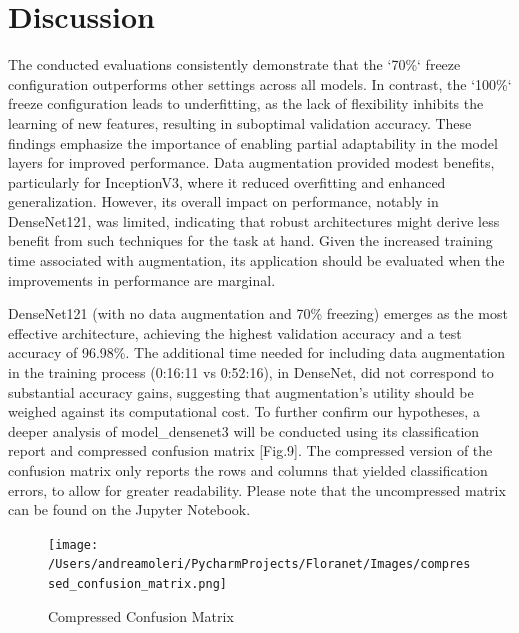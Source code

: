 
\section{Discussion}

The conducted evaluations consistently demonstrate that the `70\%` freeze configuration outperforms other settings across all models.
In contrast, the `100\%` freeze configuration leads to underfitting, as the lack of flexibility inhibits the learning
of new features, resulting in suboptimal validation accuracy. These findings emphasize the importance of enabling
partial adaptability in the model layers for improved performance. Data augmentation provided modest benefits, particularly
for InceptionV3, where it reduced overfitting and enhanced generalization. However, its overall impact on performance,
notably in DenseNet121, was limited, indicating that robust architectures might derive less benefit from such techniques
for the task at hand. Given the increased training time associated with augmentation, its application should be evaluated
when the improvements in performance are marginal.

\vspace{0.3cm}

DenseNet121 (with no data augmentation and 70\% freezing) emerges as the most effective architecture, achieving the
highest validation accuracy and a test accuracy of 96.98\%. The additional time needed for including data augmentation
in the training process (0:16:11 vs 0:52:16), in DenseNet, did not correspond to substantial accuracy gains, suggesting
that augmentation's utility should be weighed against its computational cost. To further confirm our hypotheses, a deeper
analysis of model\_densenet3 will be conducted using its classification report and compressed confusion matrix [Fig.9].
The compressed version of the confusion matrix only reports the rows and columns that yielded classification errors, to
allow for greater readability. Please note that the uncompressed matrix can be found on the Jupyter Notebook.

\begin{figure}[h!]
    \centering
    \texttt{[image: /Users/andreamoleri/PycharmProjects/Floranet/Images/compressed\_confusion\_matrix.png]}
    \caption{Compressed Confusion Matrix}
\end{figure}

